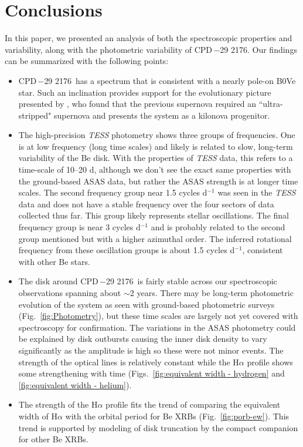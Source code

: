 \documentclass[]{aastex631}
\newcommand{\target}{CPD\,$-$29 2176}
\begin{document}
\section{Conclusions}

In this paper, we presented an analysis of both the spectroscopic properties and variability, along with the photometric variability of \target. Our findings can be summarized with the following points:
\begin{itemize}
    \item \target\ has a spectrum that is consistent with a nearly pole-on B0Ve star. Such an inclination provides support for the evolutionary picture presented by \citet{noel}, who found that the previous supernova required an ``ultra-stripped" supernova and presents the system as a kilonova progenitor.
    \item The high-precision \textit{TESS} photometry shows three groups of frequencies. One is at low frequency (long time scales) and likely is related to slow, long-term variability of the Be disk. With the properties of \textit{TESS} data, this refers to a time-scale of 10--20 d, although we don't see the exact same properties with the ground-based ASAS data, but rather the ASAS strength is at longer time scales. The second frequency group near 1.5 cycles d$^{-1}$ was seen in the \textit{TESS} data and does not have a stable frequency over the four sectors of data collected thus far. This group likely represents stellar oscillations. The final frequency group is near 3 cycles d$^{-1}$ and is probably related to the second group mentioned but with a higher azimuthal order. The inferred rotational frequency from these oscillation groups is about 1.5 cycles d$^{-1}$, consistent with other Be stars. 
    \item The disk around \target\ is fairly stable across our spectroscopic observations spanning about $\sim$2 years. There may be long-term photometric evolution of the system as seen with ground-based photometric surveys (Fig.~\ref{fig:Photometry}), but these time scales are largely not yet covered with spectroscopy for confirmation. The variations in the ASAS photometry could be explained by disk outbursts causing the inner disk density to vary significantly as the amplitude is high so these were not minor events. The strength of the optical  lines is relatively constant while the H$\alpha$ profile shows some strengthening with time (Figs.~\ref{fig:equivalent width - hydrogen} and \ref{fig:equivalent width - helium}).
    \item The strength of the H$\alpha$ profile fits the trend of comparing the equivalent width of H$\alpha$ with the orbital period for Be XRBs (Fig.~\ref{fig:porb-ew}). This trend is supported by modeling of disk truncation by the compact companion for other Be XRBs.  
\end{itemize}
\end{document}
